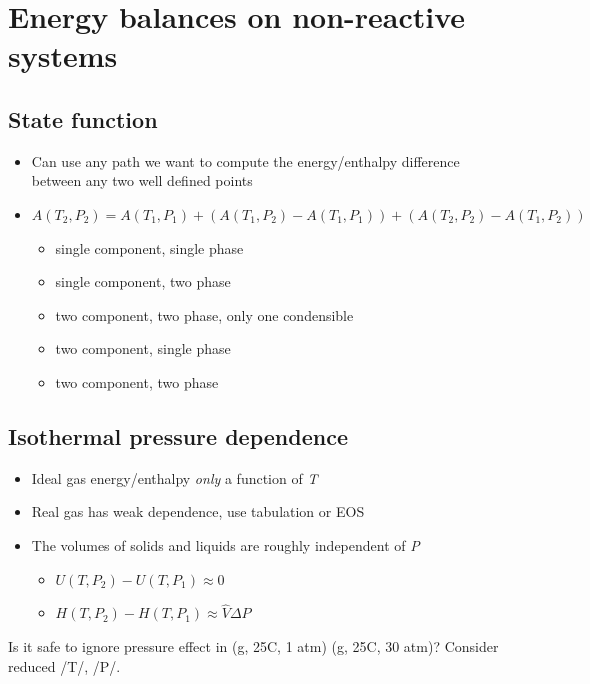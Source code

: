 \documentclass[11pt]{article}
\begin{document}
\newpage
\section{Energy balances on non-reactive systems}
\label{sec-10}
\subsection{State function}
\label{sec-10-1}
\begin{itemize}
\item Can use any path we want to compute the energy/enthalpy difference between any two well defined points
\item \( A(T_{2},P_{2}) = A(T_{1},P_{1}) + (A(T_{1},P_{2}) -A(T_{1},P_{1})) +  (A(T_{2},P_{2}) -A(T_{1},P_{2})) \)
\begin{itemize}
\item single component, single phase
\item single component, two phase
\item two component, two phase, only one condensible
\item two component, single phase
\item two component, two phase
\end{itemize}
\end{itemize}
\subsection{Isothermal pressure dependence}
\label{sec-10-2}
\begin{itemize}
\item Ideal gas energy/enthalpy \emph{only} a function of \emph{T}
\item Real gas has weak dependence, use tabulation or EOS
\item The volumes of solids and liquids are roughly independent of \emph{P}
\begin{itemize}
\item \(U(T,P_{2}) - U(T,P_{1}) \approx 0\)
\item \(H(T,P_{2}) - H(T,P_{1}) \approx \hat{V}\Delta P\)
\end{itemize}
\end{itemize}

\begin{framed}
\noindent Is it safe to ignore pressure effect in  (g, 25C, 1 atm)  (g, 25C, 30 atm)?  Consider reduced /T/, /P/.
\end{framed}
\end{document}
